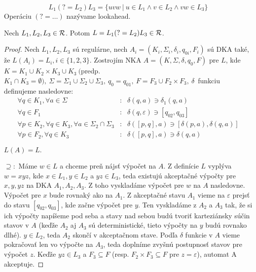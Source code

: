 \begin{df}[Lookahead]
$$ L_{1}(?=L_{2})L_{3} = \lbrace uvw ~|~ u \in L_{1} \land v \in L_{2} \land vw \in L_{3} \rbrace $$ Operáciu $(?=\dots)$ nazývame lookahead.
\end{df}

\begin{veta}
Nech $ L_{1}, L_{2}, L_{3} \in {\cal R} $. Potom $ L = L_{1}(?=L_{2})L_{3} \in {\cal R} $.
\end{veta}
\begin{proof}
Nech $ L_{1},L_{2},L_{3} $ sú regulárne, nech $ A_{i} = (K_{i},\Sigma_{i},\delta_{i},q_{0i},F_{i}) $ sú DKA také, že $ L(A_{i})=L_{i}, i \in \lbrace 1,2,3\rbrace $. Zostrojím NKA $ A = (K,\Sigma,\delta,q_{0},F) $ pre $L$, kde
$ K = K_{1} \cup K_{2} \times K_{3} \cup K_{3} ~ ( $predp. $ K_{1} \cap K_{3}= \emptyset), ~
\Sigma=\Sigma_{1}\cup\Sigma_{2}\cup\Sigma_{3}, ~ q_{0}=q_{01}, ~ F = F_{3} \cup F_{2} \times F_{3}, ~ \delta $~funkciu definujeme nasledovne:
\begin{eqnarray*}
\forall q \in K_{1}, \forall a \in \Sigma &:& \delta(q,a) \ni \delta_{1}(q,a) \\
\forall q \in F_{1} &:& \delta(q,\varepsilon ) \ni \left[ q_{02},q_{03} \right] \\
\forall p \in K_{2}, \forall q \in K_{3}, \forall a \in \Sigma_{2} \cap \Sigma_{3} &:& \delta( \left[ p,q \right] ,a) \ni \left[ \delta(p,a), \delta (q,a) \right] \\
\forall p \in F_2, \forall q \in K_3 &:& \delta(\left[p,q\right],a) \ni \delta(q,a) 
\end{eqnarray*}

$ L(A) = L. $

$ \supseteq: $ Máme $ w \in L $ a chceme preň nájsť výpočet na $A$. Z definície $L$ vyplýva $w=xyz$, kde $x \in L_1, y \in L_2$ a $yz \in L_3$, teda existujú akceptačné výpočty pre $x,y,yz$ na DKA $A_1,A_2,A_3$. Z toho vyskladáme výpočet pre $w$ na $A$ nasledovne. Výpočet pre $x$ bude rovnaký ako na $A_1$. Z akceptačné stavu $A_1$ vieme na $\varepsilon$ prejsť do stavu $\left[q_{02},q_{03}\right]$, kde začne výpočet pre $y$. Ten vyskladáme z $A_2$ a $A_3$ tak, že si ich výpočty napíšeme pod seba a stavy nad sebou budú tvoriť karteziánsky súčin stavov v $A$ (keďže $A_2$ aj $A_3$ sú deterministické, tieto výpočty na $y$ budú rovnako dlhé). $y \in L_2$, teda $A_2$ skončí v akceptačnom stave. Podľa $\delta$ funkcie v $A$ vieme pokračovať len vo výpočte na $A_3$, teda doplníme zvyšnú postupnosť stavov pre výpočet $z$. Keďže $yz \in L_3$ a $F_3\subseteq F$ (resp. $F_2\times F_3\subseteq F$ pre $z=\varepsilon$), automat A akceptuje. 


\end{proof}
